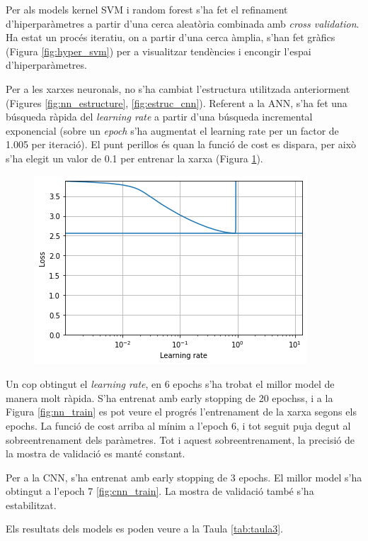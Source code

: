 \documentclass[12pt, spanish]{article}
\begin{document}
Per als models kernel SVM i random forest s'ha fet el refinament d'hiperparàmetres a partir d'una cerca aleatòria combinada amb \textit{cross validation}. Ha estat un procés iteratiu, on a partir d'una cerca àmplia, s'han fet gràfics (Figura \ref{fig:hyper_svm}) per a visualitzar tendències i encongir l'espai d'hiperparàmetres. 

Per a les xarxes neuronals, no s'ha cambiat l'estructura utilitzada anteriorment (Figures \ref{fig:nn_estructure}, \ref{fig:estruc_cnn}). Referent a la ANN, s'ha fet una búsqueda ràpida del \textit{learning rate} a partir d'una búsqueda incremental exponencial (sobre un \textit{epoch} s'ha augmentat el learning rate per un factor de 1.005 per iteració). El punt perillos és quan la funció de cost es dispara, per això s'ha elegit un valor de 0.1 per entrenar la xarxa (Figura \ref{fig:learningRate}). 

\begin{figure}[hbt!]
\centering
\includegraphics[width = 0.5\linewidth]{images/lr.png}
\label{fig:learningRate}
\end{figure}

Un cop obtingut el \textit{learning rate}, en 6 epochs s'ha trobat el millor model de manera molt ràpida. S'ha entrenat amb early stopping de 20 epochss, i a la Figura \ref{fig:nn_train} es pot veure el progrés l'entrenament de la xarxa segons els epochs. La funció de cost arriba al mínim a l'epoch 6, i tot seguit puja degut al sobreentrenament dels paràmetres. Tot i aquest sobreentrenament, la precisió de la mostra de validació es manté constant.

Per a la CNN, s'ha entrenat amb early stopping de 3 epochs. El millor model s'ha obtingut a l'epoch 7 \ref{fig:cnn_train}. La mostra de validació també s'ha estabilitzat. 

Els resultats dels models es poden veure a la Taula \ref{tab:taula3}.
\end{document}
